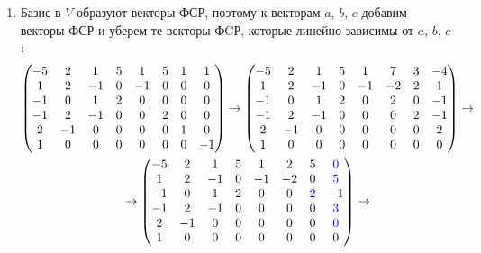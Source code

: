\documentclass[12pt]{article}
\begin{document}
\begin{enumerate}
        \item
        Базис в $V$ образуют векторы ФСР, поэтому к векторам $a$, $b$, $c$ добавим векторы ФСР и уберем те векторы ФCР, которые линейно зависимы от $a$, $b$, $c$:
        \begin{gather*}
            \begin{pmatrix}
                -5 & 2  & 1  & 5 & 1  & 5 & 1 & 1  \\
                1  & 2  & -1 & 0 & -1 & 0 & 0 & 0  \\
                -1 & 0  & 1  & 2 & 0  & 0 & 0 & 0  \\
                -1 & 2  & -1 & 0 & 0  & 2 & 0 & 0  \\
                2  & -1 & 0  & 0 & 0  & 0 & 1 & 0  \\
                1  & 0  & 0  & 0 & 0  & 0 & 0 & -1
            \end{pmatrix}
            \rightarrow
            \begin{pmatrix}
                -5 & 2  & 1  & 5 & 1  & 7  & 3 & -4 \\
                1  & 2  & -1 & 0 & -1 & -2 & 2 & 1  \\
                -1 & 0  & 1  & 2 & 0  & 2  & 0 & -1 \\
                -1 & 2  & -1 & 0 & 0  & 0  & 2 & -1 \\
                2  & -1 & 0  & 0 & 0  & 0  & 0 & 2  \\
                1  & 0  & 0  & 0 & 0  & 0  & 0 & 0
            \end{pmatrix}
            \rightarrow \\
            \rightarrow
            \begin{pmatrix}
                -5 & 2  & 1  & 5 & 1  & 2  & 5                   & \textcolor{blue}{0}  \\
                1  & 2  & -1 & 0 & -1 & -2 & 0                   & \textcolor{blue}{5}  \\
                -1 & 0  & 1  & 2 & 0  & 0  & \textcolor{blue}{2} & \textcolor{blue}{-1} \\
                -1 & 2  & -1 & 0 & 0  & 0  & 0                   & \textcolor{blue}{3}  \\
                2  & -1 & 0  & 0 & 0  & 0  & 0                   & \textcolor{blue}{0}  \\
                1  & 0  & 0  & 0 & 0  & 0  & 0                   & 0
            \end{pmatrix}
            \rightarrow

\end{gather*}
\end{enumerate}
\end{document}

